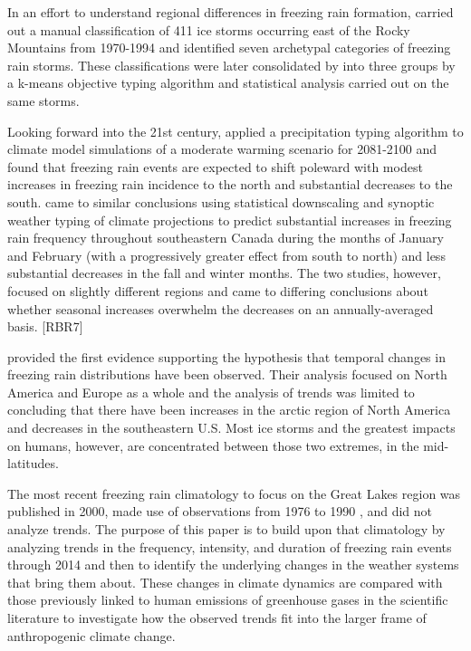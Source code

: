 \documentclass[twocol]{ametsoc}
\begin{document}
In an effort to understand regional differences in freezing rain formation, \citet{rauber2001synoptic} carried out a manual classification of 411 ice storms occurring east of the Rocky Mountains from 1970-1994 and identified seven archetypal categories of freezing rain storms. These classifications were later consolidated by \citet{erfani2012automated} into three groups by a k-means objective typing algorithm and statistical analysis carried out on the same storms. 



Looking forward into the 21st century, \citet{lambert2011simulated} applied a precipitation typing algorithm to climate model simulations of a moderate warming scenario for 2081-2100 and found that freezing rain events are expected to shift poleward with modest increases in freezing rain incidence to the north and substantial decreases to the south. \citet{cheng2011possible} came to similar conclusions using statistical downscaling and synoptic weather typing of climate projections to predict substantial increases in freezing rain frequency throughout southeastern Canada during the months of January and February (with a progressively greater effect from south to north) and less substantial decreases in the fall and winter months. The two studies, however, focused on slightly different regions and came to differing conclusions about whether seasonal increases overwhelm the decreases on an annually-averaged basis. [RBR7]




\citet{groisman2016recent} provided the first evidence supporting the hypothesis that temporal changes in freezing rain distributions have been observed. Their analysis focused on North America and Europe as a whole and the analysis of trends was limited to concluding that there have been increases in the arctic region of North America and decreases in the southeastern U.S. Most ice storms and the greatest impacts on humans, however, are concentrated between those two extremes, in the mid-latitudes.



The most recent freezing rain climatology to focus on the Great Lakes region was published in 2000, made use of observations from 1976 to 1990 \citep{cortinas2000climatology}, and did not analyze trends. The purpose of this paper is to build upon that climatology by analyzing trends in the frequency, intensity, and duration of freezing rain events through 2014 and then to identify the underlying changes in the weather systems that bring them about. These changes in climate dynamics are compared with those previously linked to human emissions of greenhouse gases in the scientific literature to investigate how the observed trends fit into the larger frame of anthropogenic climate change.
\end{document}
